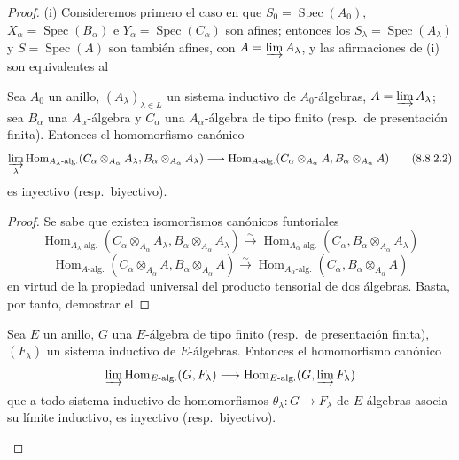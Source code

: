 \begin{proof}
(i) Consideremos primero el caso en que $S_0=\operatorname{Spec}(A_0)$, $X_\alpha=\operatorname{Spec}(B_\alpha)$ e $Y_\alpha=\operatorname{Spec}(C_\alpha)$ son afines; entonces los $S_\lambda=\operatorname{Spec}(A_\lambda)$ y $S=\operatorname{Spec}(A)$ son también afines, con $A=\varinjlim A_\lambda$, y las afirmaciones de (i) son equivalentes al

\begin{lemma}[8.8.2.1]
\label{IV.8.8.2.1-fr}
Sea $A_0$ un anillo, $(A_\lambda)_{\lambda\in L}$ un sistema inductivo de $A_0$-álgebras, $A=\varinjlim A_\lambda$; sea $B_\alpha$ una $A_\alpha$-álgebra y $C_\alpha$ una $A_\alpha$-álgebra de tipo finito \textup{(resp.}\ de presentación finita\textup{)}.
Entonces el homomorfismo canónico
\begin{equation}
\varinjlim_\lambda
\operatorname{Hom}_{A_\lambda\textup{-alg.}}
  (C_\alpha\otimes_{A_\alpha}A_\lambda,
   B_\alpha\otimes_{A_\alpha}A_\lambda)
\longrightarrow
\operatorname{Hom}_{A\textup{-alg.}}
  (C_\alpha\otimes_{A_\alpha}A,
   B_\alpha\otimes_{A_\alpha}A)
\tag{8.8.2.2}\label{IV.8.8.2.2-fr}
\end{equation}
es inyectivo \textup{(resp.}\ biyectivo\textup{)}.
\end{lemma}

\begin{proof}
Se sabe que existen isomorfismos canónicos funtoriales
\[
\operatorname{Hom}_{A_\lambda\text{-alg.}}
 (C_\alpha\otimes_{A_\alpha}A_\lambda,
  B_\alpha\otimes_{A_\alpha}A_\lambda)
\xrightarrow{\sim}
\operatorname{Hom}_{A_\alpha\text{-alg.}}
 (C_\alpha,B_\alpha\otimes_{A_\alpha}A_\lambda)
\]
\[
\operatorname{Hom}_{A\text{-alg.}}
 (C_\alpha\otimes_{A_\alpha}A,
  B_\alpha\otimes_{A_\alpha}A)
\xrightarrow{\sim}
\operatorname{Hom}_{A_\alpha\text{-alg.}}
 (C_\alpha,B_\alpha\otimes_{A_\alpha}A)
\]
en virtud de la propiedad universal del producto tensorial de dos álgebras.
Basta, por tanto, demostrar el
\end{proof}

\begin{lemma}[8.8.2.3]
\label{IV.8.8.2.3-fr}
Sea $E$ un anillo, $G$ una $E$-álgebra de tipo finito \textup{(resp.}\ de presentación finita\textup{)}, $(F_\lambda)$ un sistema inductivo de $E$-álgebras.
Entonces el homomorfismo canónico
\[
\varinjlim\operatorname{Hom}_{E\textup{-alg.}}(G,F_\lambda)
\longrightarrow
\operatorname{Hom}_{E\textup{-alg.}}(G,\varinjlim F_\lambda)
\]
que a todo sistema inductivo de homomorfismos $\theta_\lambda:G\to F_\lambda$ de $E$-álgebras asocia su límite inductivo, es inyectivo \textup{(resp.}\ biyectivo\textup{)}.
\end{lemma}


\end{proof}
